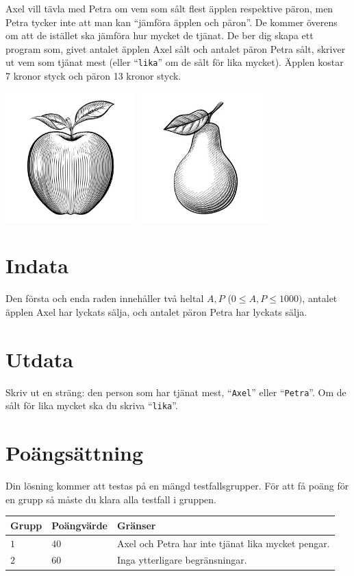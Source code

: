 Axel vill tävla med Petra om vem som sålt flest äpplen respektive päron, men Petra tycker inte att man kan ``jämföra äpplen och päron''.
De kommer överens om att de istället ska jämföra hur mycket de tjänat. De ber dig skapa ett program som, givet antalet äpplen Axel sålt och antalet päron Petra sålt,
skriver ut vem som tjänat mest (eller ``\texttt{lika}'' om de sålt för lika mycket). Äpplen kostar 7 kronor styck och päron 13 kronor styck.

\begin{center}
  \includegraphics[width=5cm]{apple.jpg}
  \includegraphics[width=5cm]{pear.jpg}
\end{center}

\section*{Indata}
Den första och enda raden innehåller två heltal $A,P$ ($0 \le A,P \le 1000)$, antalet äpplen Axel har lyckats sälja, och antalet päron Petra har lyckats sälja. 

\section*{Utdata}
Skriv ut en sträng: den person som har tjänat mest, ``\texttt{Axel}'' eller ``\texttt{Petra}''. Om de sålt för lika mycket ska du skriva ``\texttt{lika}''.

\section*{Poängsättning}
Din lösning kommer att testas på en mängd testfallsgrupper.
För att få poäng för en grupp så måste du klara alla testfall i gruppen.

\noindent
\begin{tabular}{| l | l | l |}
  \hline
  Grupp & Poängvärde & Gränser \\ \hline
  $1$   & $40$       & Axel och Petra har inte tjänat lika mycket pengar. \\ \hline
  $2$   & $60$       & Inga ytterligare begränsningar. \\ \hline
\end{tabular}